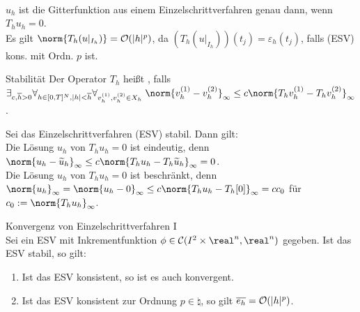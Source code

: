 \begin{Bem}\\
    $u_h$ ist die Gitterfunktion aus einem Einzelschrittverfahren genau dann,
    wenn $T_h u_h = 0$.\\
    Es gilt $\norm{T_h(u|_{I_h})} = \O(|h|^p)$,
    da $(T_h (u|_{I_h}))(t_j) = \varepsilon_h(t_j)$,
    falls (ESV) kons. mit Ordn. $p$ ist.
\end{Bem}

\linie
\pagebreak

\begin{Def}{Stabilität}
    Der Operator $T_h$ heißt , falls\\
    $\exists_{c, \overline{h} > 0} \forall_{h \in [0, T]^N, |h| < \overline{h}}
    \forall_{v_h^{(1)}, v_h^{(2)} \in X_h}\;
    \norm{v_h^{(1)} - v_h^{(2)}}_\infty \le
    c \norm{T_h v_h^{(1)} - T_h v_h^{(2)}}_\infty$.
\end{Def}

\begin{Bem}
    Sei das Einzelschrittverfahren (ESV) stabil. Dann gilt:\\
    Die Lösung $u_h$ von $T_h u_h = 0$ ist eindeutig,
    denn $\norm{u_h - \widetilde{u}_h}_\infty \le
    c \norm{T_h u_h - T_h \widetilde{u}_h}_\infty = 0$.\\
    Die Lösung $u_h$ von $T_h u_h = 0$ ist beschränkt,
    denn\\
    $\norm{u_h}_\infty = \norm{u_h - 0}_\infty \le
    c \norm{T_h u_h - T_h[0]}_\infty = c c_0$
    für $c_0 := \norm{T_h u_h}_\infty$.
\end{Bem}

\linie

\begin{Satz}{Konvergenz von Einzelschrittverfahren I}\\
    Sei ein ESV mit Inkrementfunktion
    $\phi \in \C(I^2 \times \real^n, \real^n)$ gegeben.
    Ist das ESV stabil, so gilt:
    \begin{enumerate}[label=(\emph{\roman*})]
        \item
        Ist das ESV konsistent, so ist es auch konvergent.

        \item
        Ist das ESV konsistent zur Ordnung $p \in \natural$, so gilt
        $\overline{e_h} = \mathcal{O}(|h|^p)$.
    \end{enumerate}
\end{Satz}


